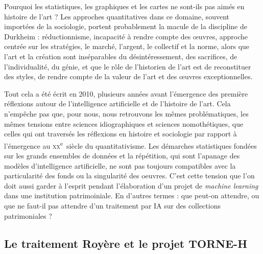 \vspace{1em}
\noindent
\hspace*{1cm}
\begin{minipage}{\dimexpr\linewidth-2cm}
\fontsize{10}{12}\selectfont
Pourquoi les statistiques, les graphiques et les cartes ne sont-ils pas aimés en histoire de l’art ? Les approches quantitatives dans ce domaine, souvent importées de la sociologie, portent probablement la macule de la discipline de Durkheim : réductionnisme, incapacité à rendre compte des œuvres, approche centrée sur les stratégies, le marché, l’argent, le collectif et la norme, alors que l’art et la création sont inséparables du désintéressement, des sacrifices, de l’individualité, du génie, et que le rôle de l’historien de l’art est de reconstituer des styles, de rendre compte de la valeur de l’art et des œuvres exceptionnelles.                                                \footnotemark{}
\end{minipage}
\vspace{1em}

Tout cela a été écrit en 2010, plusieurs années avant l'émergence des première réflexions autour de l'intelligence artificielle et de l'histoire de l'art. Cela n'empêche pas que, pour nous, nous retrouvons les mêmes problématiques, les mêmes tensions entre sciences idiographiques et sciences nomothétiques, que celles qui ont traversés les réflexions en histoire et sociologie par rapport à l'émergence au \textsc{xx}\textsuperscript{e}~siècle du quantitativisme. Les démarches statistiques fondées sur les grands ensembles de données et la répétition, qui sont l'apanage des modèles d'intelligence artificielle, ne sont pas toujours compatibles avec la particularité des fonds ou la singularité des oeuvres. C'est cette tension que l'on doit aussi garder à l'esprit pendant l'élaboration d'un projet de \textit{machine learning} dans une institution patrimoiniale. En d'autres termes : que peut-on attendre, ou que ne faut-il pas attendre d'un traitement par IA sur des collections patrimoniales ?

\subsection{Le traitement Royère et le projet TORNE-H}


